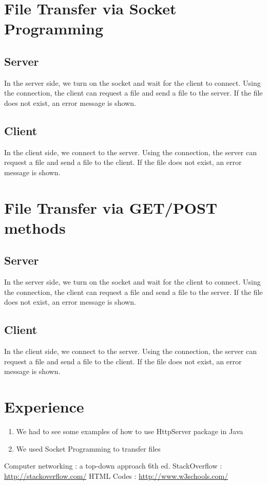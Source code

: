 \documentclass[11pt]{article}
\begin{document}
\section{File Transfer via Socket Programming}

\subsection{Server}
In the server side, we turn on the socket and wait for the client to connect. Using the connection, the client can request a file and send a file to the server. If the file does not exist, an error message is shown.

\subsection{Client}
In the client side, we connect to the server. Using the connection, the server can request a file and send a file to the client. If the file does not exist, an error message is shown. 


\section{File Transfer via GET/POST methods}

\subsection{Server}
In the server side, we turn on the socket and wait for the client to connect. Using the connection, the client can request a file and send a file to the server. If the file does not exist, an error message is shown.

\subsection{Client}
In the client side, we connect to the server. Using the connection, the server can request a file and send a file to the client. If the file does not exist, an error message is shown. 


\newpage
\section{Experience}
\begin{enumerate}
\item We had to see some examples of how to use HttpServer package in Java
\item We used Socket Programming to transfer files
\end{enumerate}

\begin{thebibliography}{1}
  Computer networking : a top-down approach 6th ed.
 StackOverflow : \url{http://stackoverflow.com/}
 HTML Codes : \url{http://www.w3schools.com/}
\end{thebibliography}
\end{document}
